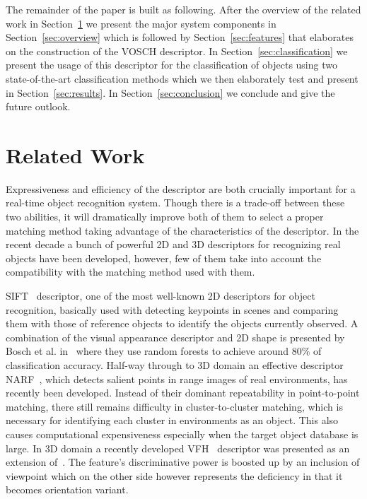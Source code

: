 \documentclass[conference]{sty/IEEEtran}
\begin{document}
The remainder of the paper is built as following. After the overview of the related
work in Section~\ref{sec:rl} we present the major system components in Section~\ref{sec:overview}
which is followed by Section~\ref{sec:features} that elaborates on the construction of the
VOSCH descriptor. In Section~\ref{sec:classification} we present the usage of this descriptor
for the classification of objects using two state-of-the-art classification methods which we
then elaborately test and present in Section~\ref{sec:results}. In Section~\ref{sec:conclusion}
we conclude and give the future outlook.

\section{Related Work}
\label{sec:rl}
Expressiveness and efficiency of the descriptor are both crucially important for
a real-time object recognition system.  Though there is a trade-off between
these two abilities, it will dramatically improve both of them to select a
proper matching method taking advantage of the characteristics of the
descriptor. In the recent decade a bunch of powerful 2D and 3D descriptors for
recognizing real objects have been developed, however, few of them take into
account the compatibility with the matching method used with them.

SIFT~\cite{lowe04distinctive} descriptor, one of the most well-known 2D
descriptors for object recognition, basically used with detecting keypoints in
scenes and comparing them with those of reference objects to identify the
objects currently observed. A combination of the visual appearance
descriptor and 2D shape is presented by Bosch et al. in~\cite{Bosch07shape}
where they use random forests to achieve around 80\% of classification 
accuracy. Half-way through to 3D domain an effective descriptor
NARF~\cite{steder10irosws}, which detects salient points in range images of
real environments, has recently been developed.  Instead of their dominant
repeatability in point-to-point matching, there still remains difficulty in
cluster-to-cluster matching, which is necessary for identifying each cluster in
environments as an object. This also causes computational expensiveness
especially when the target object database is large. In 3D domain a recently 
developed VFH~\cite{vfh} descriptor was presented as an extension 
of~\cite{Rusu09ICRA}. The feature's discriminative power is boosted up
by an inclusion of viewpoint which on the other side however represents
the deficiency in that it becomes orientation variant. 
\end{document}
